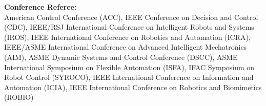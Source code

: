 \documentclass{res}
\begin{document}
\begin{resume}

    \textbf{Conference Referee:}\\
    American Control Conference (ACC),
    IEEE Conference on Decision and Control (CDC),
    IEEE/RSJ International Conference on Intelligent Robots and Systems (IROS),
    IEEE International Conference on Robotics and Automation (ICRA),
    IEEE/ASME International Conference on Advanced Intelligent Mechatronics (AIM),
    ASME Dynamic Systems and Control Conference (DSCC),
    ASME International Symposium on Flexible Automation (ISFA),
    IFAC Symposium on Robot Control (SYROCO),
    IEEE International Conference on Information and Automation (ICIA),
    IEEE International Conference on Robotics and Biomimetics (ROBIO)




\end{resume}
\end{document}
